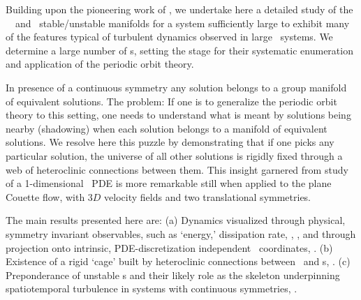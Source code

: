 Building upon the pioneering work of
, we undertake here a detailed study of the
\KS\ \eqva\ and \reqva\ stable/unstable manifolds
for a system sufficiently large to exhibit many of
the features typical of turbulent dynamics observed in large \KS\ systems.
We determine a large number of \rpo s, setting the
stage for their systematic enumeration and application
of the periodic orbit theory.

In presence of a continuous symmetry any solution belongs to a
group manifold of equivalent solutions. The problem: If one is to generalize
the periodic orbit theory to this setting, one needs to understand what
is meant by solutions being nearby (shadowing) when each solution
belongs to
a manifold of equivalent solutions.
We resolve here this puzzle by demonstrating that if one picks
any particular solution, the universe of all other solutions is
rigidly fixed through a web of heteroclinic connections between them.
This insight garnered from study of a
1-dimensional \KS\ PDE is more remarkable still when applied to
the plane Couette flow, with $3D$ velocity fields
and two translational symmetries.


The main results presented here are:
(a)
Dynamics visualized
through physical, symmetry invariant observables, such as
`energy,' dissipation rate, \etc,
, and through projection onto intrinsic, PDE-discretization
independent \statesp\ coordinates, .
(b)
Existence of a rigid `cage' built by heteroclinic connections
between \eqva\ and \po s,
.
(c)
Preponderance of unstable \rpo s and their likely
role as the skeleton underpinning spatiotemporal turbulence in
systems with continuous symmetries,
.
